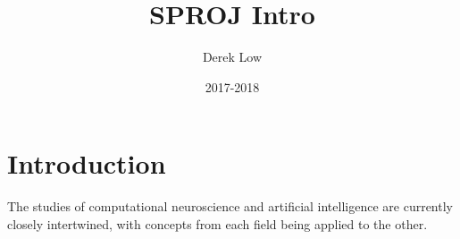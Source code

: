 \documentclass{article}
\title{SPROJ Intro}
\author{Derek Low}
\date{2017-2018}
\newcommand\tab[1][1cm]{\hspace*{#1}}
\begin{document}
\maketitle

\section{Introduction}
\tab The studies of computational neuroscience and artificial intelligence are currently closely intertwined, with concepts from each field being applied to the other. 
\end{document}
